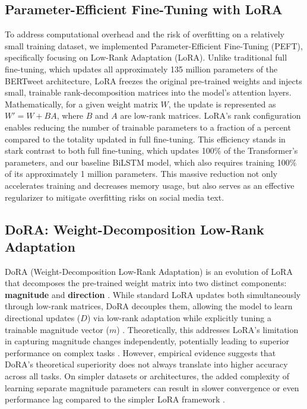 \documentclass[conference]{IEEEtran}
\begin{document}
\subsection{Parameter-Efficient Fine-Tuning with LoRA}
To address computational overhead and the risk of overfitting on a relatively small training dataset, we implemented Parameter-Efficient Fine-Tuning (PEFT), specifically focusing on Low-Rank Adaptation (LoRA)\cite{hu2021lora}. Unlike traditional full fine-tuning, which updates all approximately 135 million parameters of the BERTweet architecture, LoRA freezes the original pre-trained weights and injects small, trainable rank-decomposition matrices into the model's attention layers. Mathematically, for a given weight matrix $W$, the update is represented as $W' = W + BA$, where $B$ and $A$ are low-rank matrices. LoRA's rank configuration enables reducing the number of trainable parameters to a fraction of a percent compared to the totality updated in full fine-tuning. This efficiency stands in stark contrast to both full fine-tuning, which updates 100\% of the Transformer's parameters, and our baseline BiLSTM model, which also requires training 100\% of its approximately 1 million parameters. This massive reduction not only accelerates training and decreases memory usage, but also serves as an effective regularizer to mitigate overfitting risks on social media text.

\subsection{DoRA: Weight-Decomposition Low-Rank Adaptation}
DoRA (Weight-Decomposition Low-Rank Adaptation) is an evolution of LoRA that decomposes the pre-trained weight matrix into two distinct components: \textbf{magnitude} and \textbf{direction} \cite{prof_lecture, liu2024dora}. While standard LoRA updates both simultaneously through low-rank matrices, DoRA decouples them, allowing the model to learn directional updates ($D$) via low-rank adaptation while explicitly tuning a trainable magnitude vector ($m$) \cite{prof_lecture}. Theoretically, this addresses LoRA's limitation in capturing magnitude changes independently, potentially leading to superior performance on complex tasks \cite{liu2024dora}. However, empirical evidence suggests that DoRA's theoretical superiority does not always translate into higher accuracy across all tasks. On simpler datasets or architectures, the added complexity of learning separate magnitude parameters can result in slower convergence or even performance lag compared to the simpler LoRA framework \cite{ullah2025lora}.
\end{document}
